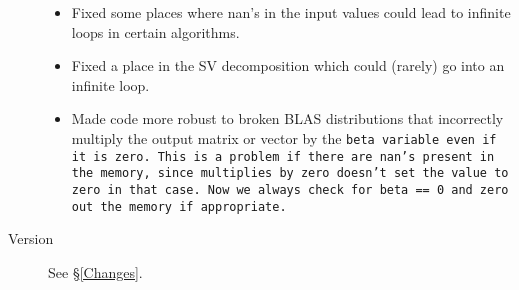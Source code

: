 \begin{description}
\begin{itemize}
\item 
Fixed some places where nan's in the input values could lead to
infinite loops in certain algorithms. 

\item 
Fixed a place in the SV decomposition which could (rarely) go into an infinite loop.

\item 
Made code more robust to broken BLAS distributions that incorrectly multiply the output matrix or vector by the \tt{beta} variable even if it is zero.  This is a problem if there are \tt{nan}'s present in the memory, since multiplies by zero doesn't set the value to zero in that case.  Now we always check for \tt{beta == 0} and zero out the memory if appropriate.

\end{itemize}

\item[Version \tmvversion] See \S\ref{Changes}.

\end{description}
